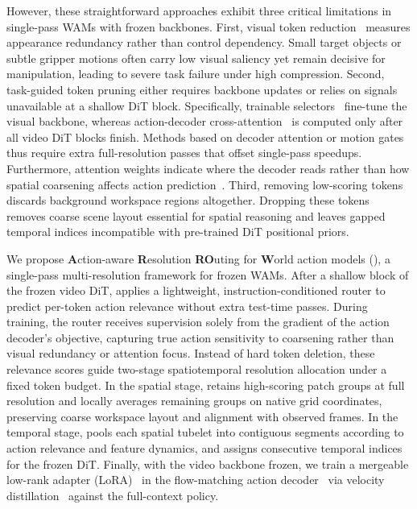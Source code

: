     However, these straightforward approaches exhibit three critical limitations in single-pass WAMs with frozen backbones.
    First, visual token reduction~\cite{bolya2023tome,chen2024fastv,hyun2025sttm} measures appearance redundancy rather than control dependency.
    Small target objects or subtle gripper motions often carry low visual saliency yet remain decisive for manipulation, leading to severe task failure under high compression.
    Second, task-guided token pruning either requires backbone updates or relies on signals unavailable at a shallow DiT block.
    Specifically, trainable selectors~\cite{brohan2023rt1,jiang2025lightvla} fine-tune the visual backbone, whereas action-decoder cross-attention~\cite{xie2026sparsewam,kim2026cfprune} is computed only after all video DiT blocks finish.
    Methods based on decoder attention or motion gates~\cite{liu2025vlapruner,pei2026adp,kim2026cfprune} thus require extra full-resolution passes that offset single-pass speedups.
    Furthermore, attention weights indicate where the decoder reads rather than how spatial coarsening affects action prediction~\cite{serrano2019attention}.
    Third, removing low-scoring tokens~\cite{chen2024fastv,liu2025vlapruner,pei2026adp,kim2026cfprune} discards background workspace regions altogether.
    Dropping these tokens removes coarse scene layout essential for spatial reasoning and leaves gapped temporal indices incompatible with pre-trained DiT positional priors.
        
    We propose \textbf{A}ction-aware \textbf{R}esolution \textbf{RO}uting for \textbf{W}orld action models (\method), a single-pass multi-resolution framework for frozen WAMs.
    After a shallow block of the frozen video DiT, \method applies a lightweight, instruction-conditioned router to predict per-token action relevance without extra test-time passes.
    During training, the router receives supervision solely from the gradient of the action decoder's objective, capturing true action sensitivity to coarsening rather than visual redundancy or attention focus.
    Instead of hard token deletion, these relevance scores guide two-stage spatiotemporal resolution allocation under a fixed token budget.
    In the spatial stage, \method retains high-scoring patch groups at full resolution and locally averages remaining groups on native grid coordinates, preserving coarse workspace layout and alignment with observed frames.
    In the temporal stage, \method pools each spatial tubelet into contiguous segments according to action relevance and feature dynamics, and assigns consecutive temporal indices for the frozen DiT.
    Finally, with the video backbone frozen, we train a mergeable low-rank adapter (LoRA)~\cite{hu2022lora} in the flow-matching action decoder~\cite{lipman2023flow} via velocity distillation~\cite{hinton2015distilling} against the full-context policy.
        
